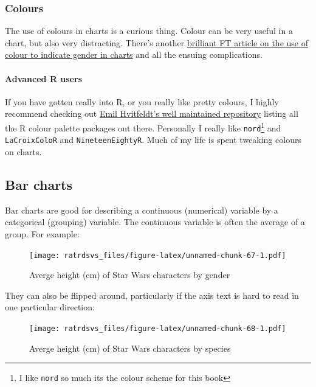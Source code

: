 \documentclass[
]{book}
\let\oldparagraph\paragraph
\renewcommand{\paragraph}[1]{\oldparagraph{#1}\mbox{}}
\begin{document}
\hypertarget{colours}{%
\subsubsection{Colours}\label{colours}}

The use of colours in charts is a curious thing. Colour can be very useful in a chart, but also very distracting. There's another \href{https://www.ft.com/content/c4b7d8be-2eb0-11e8-9b4b-bc4b9f08f381}{brilliant FT article on the use of colour to indicate gender in charts} and all the ensuing complications.

\hypertarget{advanced-r-users}{%
\paragraph{Advanced R users}\label{advanced-r-users}}

If you have gotten really into R, or you really like pretty colours, I highly recommend checking out \href{https://github.com/EmilHvitfeldt/r-color-palettes}{Emil Hvitfeldt's well maintained repository} listing all the R colour palette packages out there. Personally I really like \texttt{nord}\footnote{I like \texttt{nord} so much its the colour scheme for this book} and \texttt{LaCroixColoR} and \texttt{NineteenEightyR}. Much of my life is spent tweaking colours on charts.

\hypertarget{vis_bar}{%
\subsection{Bar charts}\label{vis_bar}}

Bar charts are good for describing a continuous (numerical) variable by a categorical (grouping) variable. The continuous variable is often the average of a group. For example:

\begin{figure}
\centering
\texttt{[image: ratrdsvs\_files/figure-latex/unnamed-chunk-67-1.pdf]}
\caption{\label{fig:unnamed-chunk-67}Averge height (cm) of Star Wars characters by gender}
\end{figure}

They can also be flipped around, particularly if the axis text is hard to read in one particular direction:

\begin{figure}
\centering
\texttt{[image: ratrdsvs\_files/figure-latex/unnamed-chunk-68-1.pdf]}
\caption{\label{fig:unnamed-chunk-68}Averge height (cm) of Star Wars characters by species}
\end{figure}
\end{document}

